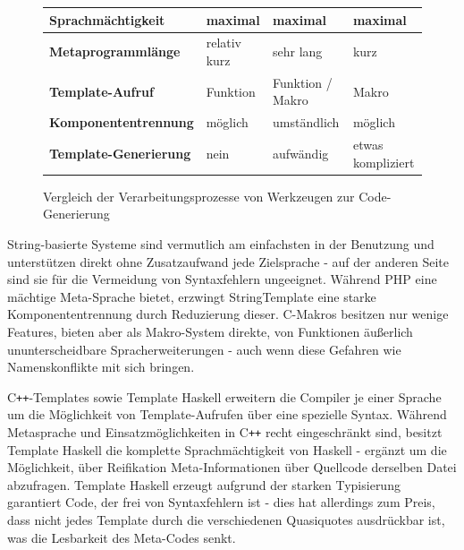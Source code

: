 \documentclass[11pt, a4paper, bibgerm]{scrbook}
\newcommand{\cpp}{C\texttt{++}}
\begin{document}
\begin{figure}
{\begin{tabular}{|l|l|l|l|}
\bf Sprachmächtigkeit       & maximal                     &maximal                     &maximal               \\\hline      
\bf Metaprogrammlänge       & relativ kurz                &sehr lang                   &kurz                  \\\hline
\bf Template-Aufruf         & Funktion                    &Funktion / Makro            &Makro                 \\\hline      
\bf Komponententrennung     & möglich                     &umständlich                 &möglich               \\\hline      
\bf Template-Generierung    & nein                        &aufwändig                   &etwas kompliziert     \\\hline      
\end{tabular}
}
\caption{Vergleich der Verarbeitungsprozesse von Werkzeugen zur Code-Generierung}
\label{magicl:fig:comp_sum}
\end{figure}

String-basierte Systeme sind vermutlich am einfachsten in der Benutzung
und unterstützen direkt ohne Zusatzaufwand jede Zielsprache - auf der
anderen Seite sind sie für die Vermeidung von Syntaxfehlern
ungeeignet. Während PHP eine mächtige Meta-Sprache bietet, erzwingt
StringTemplate eine starke Komponententrennung durch Reduzierung
dieser. C-Makros besitzen nur wenige Features, bieten aber als
Makro-System direkte, von Funktionen äußerlich ununterscheidbare
Spracherweiterungen - auch wenn diese Gefahren wie Namenskonflikte mit
sich bringen.

\cpp{}-Templates sowie Template Haskell erweitern die Compiler je einer
Sprache um die Möglichkeit von Template-Aufrufen über eine spezielle
Syntax. Während Metasprache und Einsatzmöglichkeiten in \cpp{} recht
eingeschränkt sind, besitzt Template Haskell die komplette Sprachmächtigkeit
von Haskell - ergänzt um die Möglichkeit, über Reifikation
Meta-Informationen über Quellcode derselben Datei abzufragen. Template
Haskell erzeugt aufgrund der starken Typisierung garantiert Code, der
frei von Syntaxfehlern ist - dies hat allerdings zum Preis, dass nicht
jedes Template durch die verschiedenen Quasiquotes ausdrückbar ist, was
die Lesbarkeit des Meta-Codes senkt.
\end{document}
